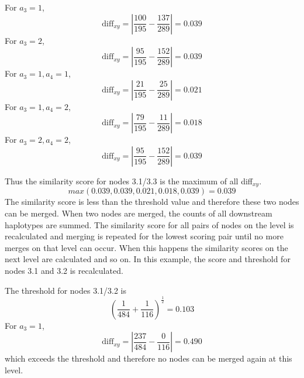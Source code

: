 \documentclass[a4paper,10pt,twoside,abstraction,titlepage]{article}
\begin{document}
\noindent For $a_3=1$,
\begin{equation*}
\mbox{diff}_{xy} =\left|\frac{100}{195}-\frac{137}{289}\right| = 0.039 
\end{equation*}
For $a_3=2$,
\begin{equation*}
\mbox{diff}_{xy} =\left|\frac{95}{195}-\frac{152}{289}\right| = 0.039
\end{equation*}
For $a_3=1, a_4=1$,
\begin{equation*}
\mbox{diff}_{xy} =\left|\frac{21}{195}-\frac{25}{289}\right| = 0.021
\end{equation*}
For $a_3=1, a_4=2$,
\begin{equation*}
\mbox{diff}_{xy} =\left|\frac{79}{195}-\frac{11}{289}\right| = 0.018
\end{equation*}
For $a_3=2, a_4=2$,
\begin{equation*}
\mbox{diff}_{xy} =\left|\frac{95}{195}-\frac{152}{289}\right| = 0.039
\end{equation*}
\vspace{1pt}

\noindent Thus the similarity score for nodes 3.1/3.3 is the maximum of all diff$_{xy}$.
\begin{equation*}
max(0.039, 0.039, 0.021, 0.018, 0.039) = 0.039
\end{equation*}
The similarity score is less than the threshold value and therefore these two nodes can be merged.  When two nodes are merged, the counts of all downstream haplotypes are summed.  The similarity score for all pairs of nodes on the level is recalculated and merging is repeated for the lowest scoring pair until no more merges on that level can occur. When this happens the similarity scores on the next level are calculated and so on.  In this example, the score and threshold for nodes 3.1 and 3.2 is recalculated.
\vspace{10pt}

\noindent The threshold for nodes 3.1/3.2 is
\vspace{-5pt}
\begin{equation*}
\left(\frac{1}{484}+\frac{1}{116}\right)^{\frac{1}{2}} = 0.103
\end{equation*}
For $a_3=1$,
\begin{equation*}
\mbox{diff}_{xy} = \left|\frac{237}{484}-\frac{0}{116}\right| = 0.490
\end{equation*}
which exceeds the threshold and therefore no nodes can be merged again at this level.
\vspace{8pt}
\end{document}

